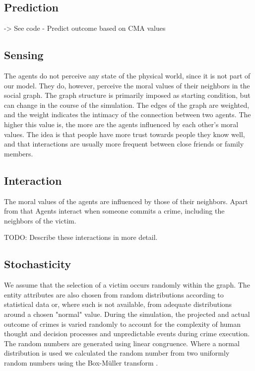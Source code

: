 \documentclass{article}
\begin{document}
		\subsection{Prediction}
			-> See code - Predict outcome based on CMA values

		\subsection{Sensing}
			The agents do not perceive any state of the physical world, since it is not part of our
			model. They do, however, perceive the moral values of their neighbors in the social
			graph. The graph structure is primarily imposed as starting condition, but can change
			in the course of the simulation. The edges of the graph are weighted, and the weight
			indicates the intimacy of the connection between two agents. The higher this value is,
			the more are the agents influenced by each other's moral values. The idea is that
			people have more trust towards people they know well, and that interactions are usually
			more frequent between close friends or family members.

		\subsection{Interaction}
			The moral values of the agents are influenced by those of their neighbors. Apart from
			that Agents interact when someone commits a crime, including the neighbors of the victim.
			\par
			TODO: Describe these interactions in more detail.

		\subsection{Stochasticity} \label{stoch}
			We assume that the selection of a victim occurs randomly within the graph.
			The entity attributes are also chosen from random distributions according to
			statistical data or, where such is not available, from adequate distributions
			around a chosen "normal" value. During the simulation, the projected and actual
			outcome of crimes is varied randomly to account for the complexity of human thought
			and decision processes and unpredictable events during crime execution. The random
			numbers are generated using linear congruence. Where a normal distribution is used
			we calculated the random number from two uniformly random numbers using the
			Box-M\"uller transform \cite{boxmuller}.
\end{document}
